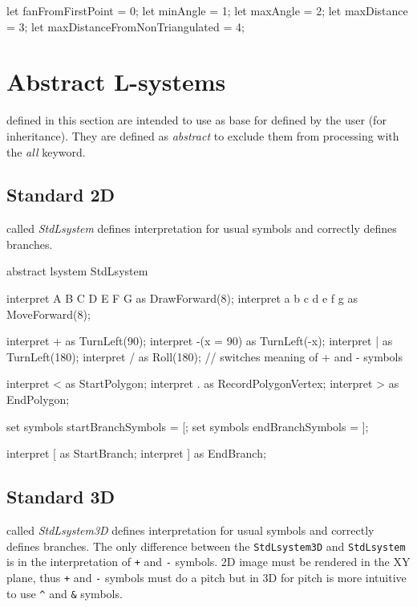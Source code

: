 \begin{LsystemBreak}
let fanFromFirstPoint = 0;
let minAngle = 1;
let maxAngle = 2;
let maxDistance = 3;
let maxDistanceFromNonTriangulated = 4;
\end{LsystemBreak}


\section{Abstract L-systems}
\label{sec:stdLibLsystems}

\lsystems defined in this section are intended to use as base \lsystems for \lsystems defined by the user (for inheritance).
They are defined as \emph{abstract} to exclude them from processing with the \emph{all} keyword.


\subsection{Standard \lsystem 2D}

\lsystem called \emph{StdLsystem} defines interpretation for usual symbols and correctly defines branches.

\begin{LsystemBreak}
abstract lsystem StdLsystem {
	interpret A B C D E F G as DrawForward(8);
	interpret a b c d e f g as MoveForward(8);

	interpret + as TurnLeft(90);
	interpret -(x = 90) as TurnLeft(-x);
	interpret | as TurnLeft(180);
	interpret / as Roll(180); // switches meaning of + and - symbols

	interpret < as StartPolygon;
	interpret . as RecordPolygonVertex;
	interpret > as EndPolygon;

	set symbols startBranchSymbols = [;
	set symbols endBranchSymbols = ];

	interpret [ as StartBranch;
	interpret ] as EndBranch;
}
\end{LsystemBreak}


\subsection{Standard \lsystem 3D}

\lsystem called \emph{StdLsystem3D} defines interpretation for usual symbols and correctly defines branches.
The only difference between the \texttt{StdLsystem3D} and \texttt{StdLsystem} is in the interpretation of \texttt{+} and \texttt{-} symbols.
2D image must be rendered in the XY plane, thus \texttt{+} and \texttt{-} symbols must do a pitch but in 3D for pitch is more intuitive to use \texttt{\^{}} and \texttt{\&} symbols.

